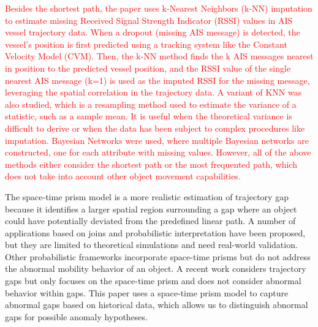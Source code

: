 \documentclass[acmsmall]{acmart}
\begin{document}
\textcolor{red}{Besides the shortest path, the paper \cite{mazzarella2017novel} uses k-Nearest Neighbors (k-NN) imputation to estimate missing Received Signal Strength Indicator (RSSI) values in AIS vessel trajectory data. When a dropout (missing AIS message) is detected, the vessel's position is first predicted using a tracking system like the Constant Velocity Model (CVM). Then, the k-NN method finds the k AIS messages nearest in position to the predicted vessel position, and the RSSI value of the single nearest AIS message (k=1) is used as the imputed RSSI for the missing message, leveraging the spatial correlation in the trajectory data. A variant of KNN \cite{chen2001jackknife} was also studied, which is a resampling method used to estimate the variance of a statistic, such as a sample mean. It is useful when the theoretical variance is difficult to derive or when the data has been subject to complex procedures like imputation. Bayesian Networks \cite{hruschka2007bayesian} were used, where multiple Bayesian networks are constructed, one for each attribute with missing values. However, all of the above methods either consider the shortest path or the most frequented path, which does not take into account other object movement capabilities.}

The space-time prism model \cite{miller1991modelling,pfoser1999capturing} is a more realistic estimation of trajectory gap because it identifies a larger spatial region surrounding a gap where an object could have potentially deviated from the predefined linear path. A number of applications based on joins \cite{pfoser1999capturing} and probabilistic interpretation \cite{winter2010directed} have been proposed, but they are limited to theoretical simulations and need real-world validation. Other probabilistic frameworks \cite{cheng2008probabilistic,trajcevski2010uncertain} incorporate space-time prisms but do not address the abnormal mobility behavior of an object. A recent work \cite{zhao2021applying} considers trajectory gaps but only focuses on the space-time prism and does not consider abnormal behavior within gaps. This paper uses a space-time prism model to capture abnormal gaps based on historical data, which allows us to distinguish abnormal gaps for possible anomaly hypotheses.

\end{document}
